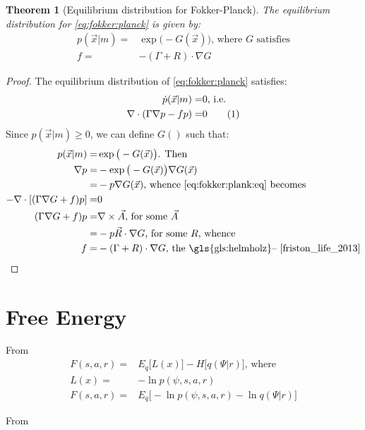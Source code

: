 \documentclass[]{article}
\newcommand\numberthis{\addtocounter{equation}{1}\tag{\theequation}}
\newtheorem{thm}{Theorem}
\begin{document}
\begin{thm}[Equilibrium distribution for Fokker-Planck]
	The equilibrium distribution for \eqref{eq:fokker:planck} is given by:
	\begin{align*}
		p(\vec{x}\vert m) =& \exp \big(-G(\vec{x})\big) \text{, where $G$ satisfies}\\
		f =& -(\Gamma + R) \cdot \nabla G
	\end{align*}
	
\end{thm}
\begin{proof}
The equilibrium distribution of \eqref{eq:fokker:planck} satisfies:
	\begin{align*}
		\dot{p}(\vec{x}\vert m) =&0 \text{, i.e.}\\
		\nabla \cdot (\Gamma \nabla p -f p)=&0 \numberthis \label{eq:fokker:plank:eq}
	\end{align*}
	Since $	p(\vec{x}\vert m) \ge 0$, we can define $G()$ such that:
	\begin{align*}
		p(\vec{x}\vert m) =& \exp \big(-G(\vec{x})\big) \text{. Then}\\
		\nabla p =& - \exp \big(-G(\vec{x})\big) \nabla G(\vec{x})\\
		=& - p \nabla G(\vec{x}) \text{, whence \eqref{eq:fokker:plank:eq} becomes}\\
		-\nabla \cdot [(\Gamma \nabla G +f)p]=&0\\
		 (\Gamma \nabla G +f)p =& \nabla \times \vec{A} \text{, for some $\vec{A}$}\\
		 =& -p \vec{R} \cdot \nabla G \text{, for some $R$, whence}\\
		 f =& -(\Gamma + R) \cdot \nabla G \text{, the \gls{gls:helmholz}-- \cite[(2.3)]{friston_life_2013}}
	\end{align*}
\end{proof}

\section{Free Energy}


From \cite{friston2016therefore}
\begin{align*}
	F(s,a,r) =& E_q\big[L(x)\big]-H\big[q(\Psi\vert r)\big] \text{, where}\\
	L(x) =& -\ln{p(\psi,s,a,r)}\\
	F(s,a,r) =&  E_q\big[ -\ln{p(\psi,s,a,r)} - \ln{q(\Psi\vert r)}\big]
\end{align*}

From \cite{friston2022free}
\end{document}
